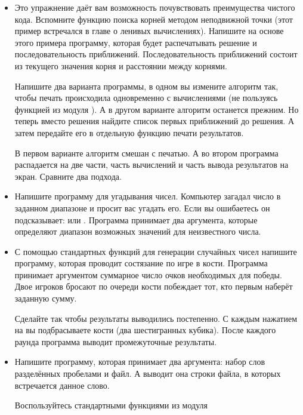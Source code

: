 \begin{itemize}

\item Это упражнение даёт вам возможность почувствовать
    преимущества чистого кода. Вспомните функцию поиска
    корней методом неподвижной точки (этот пример встречался
    в главе о ленивых вычислениях). Напишите на основе
    этого примера программу, которая будет распечатывать
    решение и последовательность приближений. Последовательность
    приближений состоит из текущего значения корня и 
    расстоянии между корнями. 

    Напишите два варианта программы, в одном вы измените алгоритм
    так, чтобы печать происходила одновременно с вычислениями 
    (не пользуясь функцией из модуля ). 
    А в другом варианте алгоритм останется прежним. Но
    теперь вместо решения найдите список первых приближений до
    решения. А затем передайте его в отдельную функцию 
    печати результатов.

    В первом варианте алгоритм смешан с печатью. А во втором
    программа распадается на две части, часть вычислений и
    часть вывода результатов на экран. Сравните два подхода.
    
\item Напишите программу для угадывания чисел. Компьютер
    загадал число в заданном диапазоне и просит вас угадать его.
    Если вы ошибаетесь он подсказывает: 
    или . Программа принимает два аргумента,
    которые определяют диапазон возможных значений для неизвестного
    числа.

\item С помощью стандартных функций для генерации случайных
    чисел напишите программу, которая проводит состязание
    по игре в кости. Программа принимает аргументом суммарное число
    очков необходимых для победы. Двое игроков бросают по очереди 
    кости побеждает тот, кто первым наберёт заданную сумму.

    Сделайте так чтобы результаты выводились постепенно. С каждым
    нажатием на  вы подбрасываете кости (два 
    шестигранных кубика). После каждого раунда программа выводит 
    промежуточные результаты.
    

\item Напишите программу, которая принимает два аргумента:
    набор слов разделённых пробелами и файл. А выводит она
    строки файла, в которых встречается данное слово. 

    Воспользуйтесь стандартными функциями из модуля 


\end{itemize}

